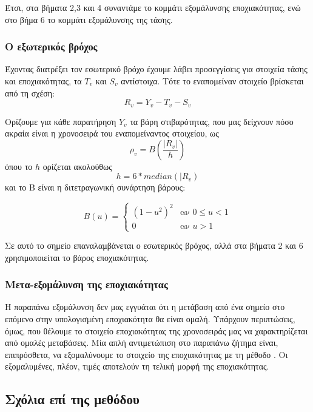 Έτσι, στα βήματα 2,3 και 4 συναντάμε το κομμάτι εξομάλυνσης εποχιακότητας, ενώ στο βήμα 6 το κομμάτι εξομάλυνσης της τάσης. 

\subsubsection{Ο εξωτερικός βρόχος}

Έχοντας διατρέξει τον εσωτερικό βρόχο έχουμε λάβει προσεγγίσεις για στοιχεία τάσης και εποχιακότητας, τα $T_v$ και $S_v$ αντίστοιχα. Τότε το εναπομείναν στοιχείο βρίσκεται από τη σχέση:
\[ R_v = Y_v - T_v - S_v\]

Ορίζουμε για κάθε παρατήρηση $Y_v$ τα βάρη στιβαρότητας, που μας δείχνουν πόσο ακραία είναι η χρονοσειρά του εναπομείναντος στοιχείου, ως
\[\rho_v = B(\frac{|R_v|}{h})\]
όπου το $h$ ορίζεται ακολούθως
\[ h = 6*median(|R_v)\]
και το B είναι η διτετραγωνική συνάρτηση βάρους:

\begin{equation}
B(u) =
\left\{
	\begin{array}{ll}
		(1 - u^2)^2  & \mbox{αν } 0 \leq u < 1 \\
		0 & \mbox{αν } u > 1
	\end{array}
\right.
\end{equation}

Σε αυτό το σημείο επαναλαμβάνεται ο εσωτερικός βρόχος, αλλά στα βήματα 2 και 6 χρησιμοποιείται το βάρος εποχιακότητας. 

\subsubsection{Μετα-εξομάλυνση της εποχιακότητας}

Η παραπάνω εξομάλυνση δεν μας εγγυάται ότι η μετάβαση από ένα σημείο στο επόμενο στην υπολογισμένη εποχιακότητα θα είναι ομαλή. Υπάρχουν περιπτώσεις, όμως, που θέλουμε το στοιχείο εποχιακότητας της χρονοσειράς μας να χαρακτηρίζεται από ομαλές μεταβάσεις. Μία απλή αντιμετώπιση στο παραπάνω ζήτημα είναι, επιπρόσθετα, να εξομαλύνουμε το στοιχείο της εποχιακότητας με τη μέθοδο . Οι εξομαλυμένες, πλέον, τιμές αποτελούν τη τελική μορφή της εποχιακότητας.

\subsection{Σχόλια επί της μεθόδου}

